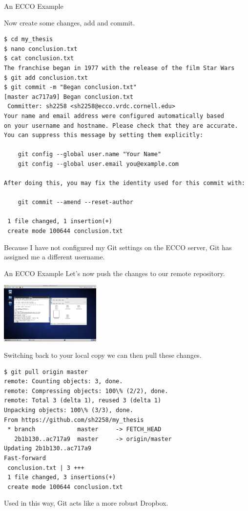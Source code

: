 \documentclass[10pt]{beamer}
\begin{document}
\begin{frame}[fragile]{An ECCO Example}

Now create some changes, add and commit.
\begin{lstlisting}
$ cd my_thesis
$ nano conclusion.txt
$ cat conclusion.txt
The franchise began in 1977 with the release of the film Star Wars
$ git add conclusion.txt
$ git commit -m "Began conclusion.txt"
[master ac717a9] Began conclusion.txt
 Committer: sh2258 <sh2258@ecco.vrdc.cornell.edu>
Your name and email address were configured automatically based
on your username and hostname. Please check that they are accurate.
You can suppress this message by setting them explicitly:

    git config --global user.name "Your Name"
    git config --global user.email you@example.com

After doing this, you may fix the identity used for this commit with:

    git commit --amend --reset-author

 1 file changed, 1 insertion(+)
 create mode 100644 conclusion.txt
\end{lstlisting}
Because I have not configured my Git settings on the ECCO server, Git has assigned me a different username.





\end{frame}

\begin{frame}[fragile]{An ECCO Example}
Let's now push the changes to our remote repository.

\begin{center}
\includegraphics[width=5cm]{./auxfiles/ECCO2.jpg}
\end{center}

Switching back to your local copy we can then pull these changes.
\begin{lstlisting}
$ git pull origin master
remote: Counting objects: 3, done.
remote: Compressing objects: 100\% (2/2), done.
remote: Total 3 (delta 1), reused 3 (delta 1)
Unpacking objects: 100\% (3/3), done.
From https://github.com/sh2258/my_thesis
 * branch            master     -> FETCH_HEAD
   2b1b130..ac717a9  master     -> origin/master
Updating 2b1b130..ac717a9
Fast-forward
 conclusion.txt | 3 +++
 1 file changed, 3 insertions(+)
 create mode 100644 conclusion.txt
\end{lstlisting}


Used in this way, Git acts like a more robust Dropbox. \\


\end{frame}
\end{document}
